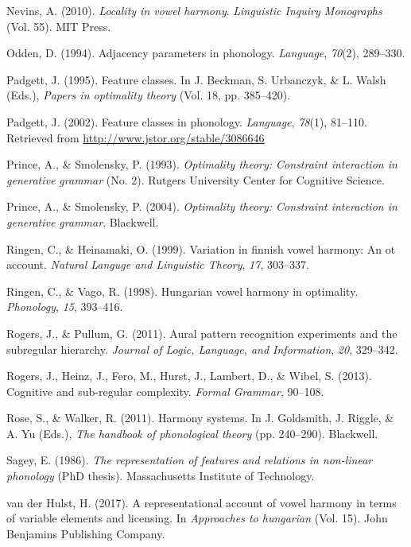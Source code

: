 \documentclass[,doc,floatsintext]{apa6}
\theoremstyle{definition}
\theoremstyle{definition}
\theoremstyle{definition}
\theoremstyle{remark}
\begin{document}
\hypertarget{ref-Nevins2010}{}
Nevins, A. (2010). \emph{Locality in vowel harmony}. \emph{Linguistic
Inquiry Monographs} (Vol. 55). MIT Press.

\hypertarget{ref-odden1994}{}
Odden, D. (1994). Adjacency parameters in phonology. \emph{Language},
\emph{70}(2), 289--330.

\hypertarget{ref-padgett1995}{}
Padgett, J. (1995). Feature classes. In J. Beckman, S. Urbanczyk, \& L.
Walsh (Eds.), \emph{Papers in optimality theory} (Vol. 18, pp.
385--420).

\hypertarget{ref-padgett2002}{}
Padgett, J. (2002). Feature classes in phonology. \emph{Language},
\emph{78}(1), 81--110. Retrieved from
\url{http://www.jstor.org/stable/3086646}

\hypertarget{ref-princesmolensky1993}{}
Prince, A., \& Smolensky, P. (1993). \emph{Optimality theory: Constraint
interaction in generative grammar} (No. 2). Rutgers University Center
for Cognitive Science.

\hypertarget{ref-princesmolensky2004}{}
Prince, A., \& Smolensky, P. (2004). \emph{Optimality theory: Constraint
interaction in generative grammar}. Blackwell.

\hypertarget{ref-ringenheinamaki1999}{}
Ringen, C., \& Heinamaki, O. (1999). Variation in finnish vowel harmony:
An ot account. \emph{Natural Languge and Linguistic Theory}, \emph{17},
303--337.

\hypertarget{ref-ringenvago1998}{}
Ringen, C., \& Vago, R. (1998). Hungarian vowel harmony in optimality.
\emph{Phonology}, \emph{15}, 393--416.

\hypertarget{ref-rogerspullum2011}{}
Rogers, J., \& Pullum, G. (2011). Aural pattern recognition experiments
and the subregular hierarchy. \emph{Journal of Logic, Language, and
Information}, \emph{20}, 329--342.

\hypertarget{ref-rogersetal2013}{}
Rogers, J., Heinz, J., Fero, M., Hurst, J., Lambert, D., \& Wibel, S.
(2013). Cognitive and sub-regular complexity. \emph{Formal Grammar},
90--108.

\hypertarget{ref-rosewalker2011}{}
Rose, S., \& Walker, R. (2011). Harmony systems. In J. Goldsmith, J.
Riggle, \& A. Yu (Eds.), \emph{The handbook of phonological theory} (pp.
240--290). Blackwell.

\hypertarget{ref-sagey1986}{}
Sagey, E. (1986). \emph{The representation of features and relations in
non-linear phonology} (PhD thesis). Massachusetts Institute of
Technology.

\hypertarget{ref-vdHulst2017}{}
van der Hulst, H. (2017). A representational account of vowel harmony in
terms of variable elements and licensing. In \emph{Approaches to
hungarian} (Vol. 15). John Benjamins Publishing Company.
\end{document}
